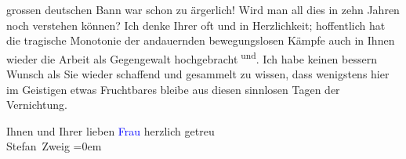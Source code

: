                grossen deutschen Bann war schon zu ärgerlich! Wird man all dies in zehn Jahren noch
               verstehen können? Ich denke Ihrer oft und in Herzlichkeit; hoffentlich hat die
               tragische Monotonie der andauernden bewegungslosen Kämpfe auch in Ihnen wieder die
               Arbeit als Gegengewalt hochgebracht\substVorne{}\textsuperscript{{ }und}\substDazwischen{}.\substHinten{} Ich habe keinen bessern Wunsch als Sie wieder schaffend und gesammelt zu
               wissen, dass wenigstens hier im Geistigen etwas Fruchtbares bleibe aus diesen
               sinnlosen Tagen der Vernichtung.\pend
           
\pstart
           Ihnen und Ihrer lieben \textcolor{blue}{Frau}\ledrightnote{{$\rightarrow$}\emph{\textcolor{blue}{Olga Schnitzler}}} herzlich getreu{\\[\baselineskip]}\spacefill\mbox{Stefan Zweig}\pend
           \leftskip=0em{}\endnumbering{}  
      